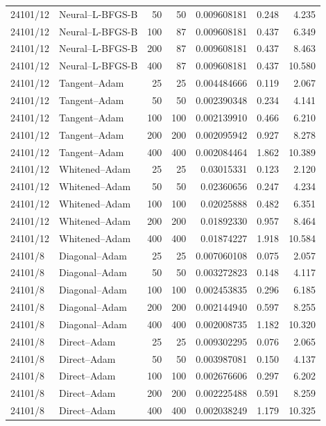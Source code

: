 \begin{longtable}{llrrrrr}
24101/12 & Neural--L-BFGS-B & 50 & 50 & 0.009608181 & 0.248 & 4.235\\
24101/12 & Neural--L-BFGS-B & 100 & 87 & 0.009608181 & 0.437 & 6.349\\
24101/12 & Neural--L-BFGS-B & 200 & 87 & 0.009608181 & 0.437 & 8.463\\
24101/12 & Neural--L-BFGS-B & 400 & 87 & 0.009608181 & 0.437 & 10.580\\
24101/12 & Tangent--Adam & 25 & 25 & 0.004484666 & 0.119 & 2.067\\
24101/12 & Tangent--Adam & 50 & 50 & 0.002390348 & 0.234 & 4.141\\
24101/12 & Tangent--Adam & 100 & 100 & 0.002139910 & 0.466 & 6.210\\
24101/12 & Tangent--Adam & 200 & 200 & 0.002095942 & 0.927 & 8.278\\
24101/12 & Tangent--Adam & 400 & 400 & 0.002084464 & 1.862 & 10.389\\
24101/12 & Whitened--Adam & 25 & 25 & 0.03015331 & 0.123 & 2.120\\
24101/12 & Whitened--Adam & 50 & 50 & 0.02360656 & 0.247 & 4.234\\
24101/12 & Whitened--Adam & 100 & 100 & 0.02025888 & 0.482 & 6.351\\
24101/12 & Whitened--Adam & 200 & 200 & 0.01892330 & 0.957 & 8.464\\
24101/12 & Whitened--Adam & 400 & 400 & 0.01874227 & 1.918 & 10.584\\
24101/8 & Diagonal--Adam & 25 & 25 & 0.007060108 & 0.075 & 2.057\\
24101/8 & Diagonal--Adam & 50 & 50 & 0.003272823 & 0.148 & 4.117\\
24101/8 & Diagonal--Adam & 100 & 100 & 0.002453835 & 0.296 & 6.185\\
24101/8 & Diagonal--Adam & 200 & 200 & 0.002144940 & 0.597 & 8.255\\
24101/8 & Diagonal--Adam & 400 & 400 & 0.002008735 & 1.182 & 10.320\\
24101/8 & Direct--Adam & 25 & 25 & 0.009302295 & 0.076 & 2.065\\
24101/8 & Direct--Adam & 50 & 50 & 0.003987081 & 0.150 & 4.137\\
24101/8 & Direct--Adam & 100 & 100 & 0.002676606 & 0.297 & 6.202\\
24101/8 & Direct--Adam & 200 & 200 & 0.002225488 & 0.591 & 8.259\\
24101/8 & Direct--Adam & 400 & 400 & 0.002038249 & 1.179 & 10.325\\

\end{longtable}

